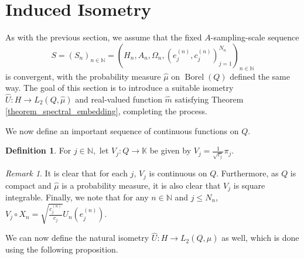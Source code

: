 \documentclass{amsart}
\theoremstyle{definition}
\newtheorem{definition}[thm]{Definition}
\theoremstyle{remark}
\newtheorem{remark}[thm]{Remark}
\def \Borel{\operatorname{Borel}}
\def \HMU{\hat{\mu}}
\def \HU{\hat{U}}
\def \Hm{\hat{m}}
\begin{document}
\section{Induced Isometry}
As with the previous section, we assume that the fixed $A$-sampling-scale sequence $$S=(S_n)_{n\in\mathbb{N}}=(H_n,A_n,\Omega_n,(e_j^{(n)},c_j^{(n)})_{j=1}^{N_n})_{n\in\mathbb{N}}$$ is convergent, with the probability measure $\HMU$ on $\Borel(Q)$ defined the same way. The goal of this section is to introduce a suitable isometry $\HU:H\rightarrow L_2(Q,\HMU)$ and real-valued function $\Hm$ satisfying Theorem \ref{theorem_spectral_embedding}, completing the process.
 
We now define an important sequence of continuous functions on $Q$.

\begin{definition}
	For $j\in\mathbb{N},$ let $V_j: Q\rightarrow\mathbb{K}$ be given by  $V_j=\frac{1}{\sqrt{c_j}}\pi_j.$
\end{definition}
\begin{remark}
	It is clear that for each $j$, $V_j$ is continuous on $Q$. Furthermore, as $Q$ is compact and $\HMU$ is a probability measure, it is also clear that $V_j$ is square integrable. Finally, we note that for any $n\in\mathbb{N}$ and $j\leq N_n$, $V_j\circ X_n=\sqrt{\frac{c_j^{(n)}}{c_j}}U_n(e_j^{(n)}).$
\end{remark}
We can now define the natural isometry $\HU: H\rightarrow L_2(Q,\HMU)$ as well, which is done using the following proposition.
\end{document}
